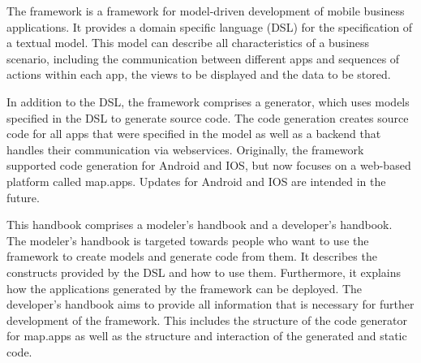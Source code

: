 
The \MD framework is a framework for model-driven development of mobile business applications. It provides a domain specific language (DSL) for the specification of a textual model. This model can describe all characteristics of a business scenario, including the communication between different apps and sequences of actions within each app, the views to be displayed and the data to be stored.

In addition to the DSL, the \MD framework comprises a generator, which uses models specified in the DSL to generate source code. The code generation creates source code for all apps that were specified in the model as well as a backend that handles their communication via webservices. Originally, the \MD framework supported code generation for Android and IOS, but now focuses on a web-based platform called map.apps. Updates for Android and IOS are intended in the future.

This handbook comprises a modeler's handbook and a developer's handbook. The modeler's handbook is targeted towards people who want to use the \MD framework to create models and generate code from them. It describes the constructs provided by the DSL and how to use them. Furthermore, it explains how the applications generated by the framework can be deployed. The developer's handbook aims to provide all information that is necessary for further development of the \MD framework. This includes the structure of the code generator for map.apps as well as the structure and interaction of the generated and static code.